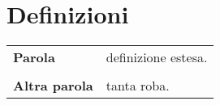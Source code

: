 \section{Definizioni}
\begin{tabular}{l l}
	\textbf{Parola} & definizione estesa. \\ \\
	\textbf{Altra parola} & tanta roba.
\end{tabular}
